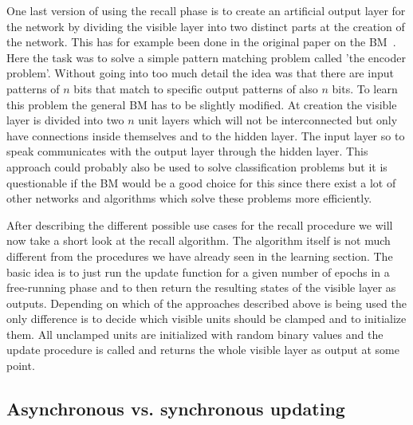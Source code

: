 \documentclass[12pt,twoside]{article}
\theoremstyle{plain}
\theoremstyle{definition}
\theoremstyle{remark}
\begin{document}
One last version of using the recall phase is to create an artificial output layer for the network by dividing the visible layer
into two distinct parts at the creation of the network. This has for example been done in the original paper on the BM~\cite{Ackley}. 
Here the task was to solve a simple pattern matching problem called 'the encoder problem'.
Without going into too much detail the idea was that there are input patterns of $n$ bits that match to specific output
patterns of also $n$ bits. To learn this problem the general BM has to be slightly modified.
At creation the visible layer is divided into two $n$ unit layers which will not be interconnected but only have 
connections inside themselves and to the hidden layer. The input layer so to speak communicates with the output layer
through the hidden layer. This approach could probably also be used to solve classification problems but it
is questionable if the BM would be a good choice for this since there exist a lot of other 
networks and algorithms which solve these problems more efficiently.\newline

After describing the different possible use cases for the recall procedure we will now take a short look at 
the recall algorithm. The algorithm itself is not much different from the 
procedures we have already seen in the learning section. The basic idea is to just run the update function
for a given number of epochs in a free-running phase and to then return the resulting states of the
visible layer as outputs. Depending on which of the approaches described above is being used the only
difference is to decide which visible units should be clamped and to initialize them. 
All unclamped units are initialized with random binary values and the update procedure is called 
and returns the whole visible layer as output at some point.


\subsection{Asynchronous vs. synchronous updating}
\label{subsec:updating-procedures}
\end{document}
